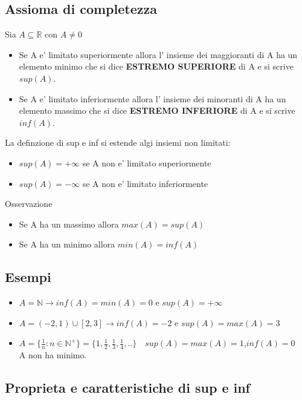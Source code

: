 \documentclass{article}
\begin{document}
    \subsection{Assioma di completezza}
    \begin{flushleft}
    Sia $A \subseteq \mathbb{R}$ con $A \neq 0$
        \begin{itemize}
            \item Se A e' limitato superiormente allora l' insieme dei maggioranti di A ha un elemento minimo
            che si dice \textbf{ESTREMO SUPERIORE} di A e si scrive $sup(A)$.
            \item Se A e' limitato inferiormente allora l' insieme dei minoranti di A ha un elemento massimo
            che si dice \textbf{ESTREMO INFERIORE} di A e si scrive $inf(A)$.
        \end{itemize}
        La definzione di sup e inf si estende algi insiemi non limitati:
        \begin{itemize}
            \item $sup(A)=+\infty$ se A non e' limitato superiormente
            \item $sup(A)=-\infty$ se A non e' limitato inferiormente
        \end{itemize}
        Osservazione
        \begin{itemize}
            \item Se A ha un massimo allora $max(A)=sup(A)$
            \item Se A ha un minimo allora $min(A)=inf(A)$
        \end{itemize}
        \subsection{Esempi}
        \begin{itemize}
            \item $A = \mathbb{N} \rightarrow inf(A)=min(A)=0$ e $sup(A)=+\infty$
            \item $A = (-2,1)\cup[2,3]\rightarrow inf(A)=-2$ e $sup(A)=max(A)=3$
            \item $A = \{\frac{1}{n}:n\in \mathbb{N}^+\}=\{1,\frac{1}{2},\frac{1}{3},\frac{1}{4},..\}\quad sup(A)=max(A)=1$,$inf(A)=0$\\ A non ha minimo.
        \end{itemize}
        \subsection{Proprieta e caratteristiche di sup e inf}

\end{flushleft}
\end{document}
